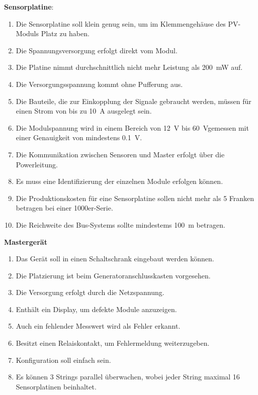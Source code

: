 \textbf{Sensorplatine}:
\begin{enumerate}
    \item
        Die Sensorplatine  soll klein  genug sein, um im  Klemmengeh\"ause des
        PV-Moduls Platz zu haben.
    \item
        Die Spannungsversorgung erfolgt direkt vom Modul.
    \item
        Die   Platine  nimmt   durchschnittlich   nicht   mehr  Leistung   als
        \SI{200}{\milli\watt} auf.
    \item
        Die Versorgungsspannung kommt ohne Pufferung aus.
    \item
        Die  Bauteile,  die  zur  Einkopplung der  Signale  gebraucht  werden,
        m\"ussen f\"ur einen Strom von bis zu \SI{10}{\ampere} ausgelegt sein.
    \item
        Die   Modulspannung  wird   in   einem   Bereich  von   \SI{12}{\volt}
        bis  \SI{60}{\volt}gemessen  mit   einer  Genauigkeit  von  mindestens
        \SI{0.1}{\volt}.
    \item
        Die  Kommunikation zwischen  Sensoren  und Master  erfolgt \"uber  die
        Powerleitung.
    \item
        Es muss eine Identifizierung der einzelnen Module erfolgen k\"onnen.
    \item
        Die Produktionskosten f\"ur eine Sensorplatine sollen nicht mehr als 5
        Franken betragen bei einer 1000er-Serie.
    \item
        Die  Reichweite  des  Bus-Systems sollte  mindestems  \SI{100}{\meter}
        betragen.
\end{enumerate}

\clearpage
\textbf{Masterger\"at}
\begin{enumerate}
    \item
        Das Ger\"at soll in einen Schaltschrank eingebaut werden k\"onnen.
    \item
        Die Platzierung ist beim Generatoranschlusskasten vorgesehen.
    \item
        Die Versorgung erfolgt durch die Netzspannung.
    \item
        Enth\"alt ein Display, um defekte Module anzuzeigen.
    \item
        Auch ein fehlender Messwert wird als Fehler erkannt.
    \item
        Besitzt einen Relaiskontakt, um Fehlermeldung weiterzugeben.
    \item
        Konfiguration soll einfach sein.
    \item
        Es  k\"onnen  3  Strings  parallel \"uberwachen,  wobei  jeder  String
        maximal 16 Sensorplatinen beinhaltet.~\footnotemark[1]
\end{enumerate}

